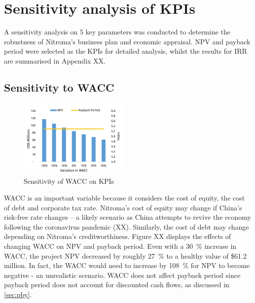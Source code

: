 \section{Sensitivity analysis of KPIs}
\label{sec:sensitivities-kpis}
A sensitivity analysis on 5 key parameters was conducted to determine the robustness of Nitroma’s business plan and economic appraisal. NPV and payback period were selected as the KPIs for detailed analysis, whilst the results for IRR are summarised in Appendix XX. 

\subsection{Sensitivity to WACC}
\begin{figure}
    \vspace{-1.1cm}
    \caption{Sensitivity of WACC on KPIs}
    \label{Sensitivity_WACC}
    \includegraphics[width=0.47\textwidth]{chapters/6-economics/figures/Sensitivity_WACC.jpg}
\end{figure}
WACC is an important variable because it considers the cost of equity, the cost of debt and corporate tax rate. Nitroma’s cost of equity may change if China’s risk-free rate changes – a likely scenario as China attempts to revive the economy following the coronavirus pandemic (XX). Similarly, the cost of debt may change depending on Nitroma’s creditworthiness.  Figure XX displays the effects of changing WACC on NPV and payback period. Even with a \SI{30}{\percent} increase in WACC, the project NPV decreased by roughly \SI{27}{\percent} to a healthy value of \$61.2 million. In fact, the WACC would need to increase by \SI{108}{\percent} for NPV to become negative - an unrealistic scenario. WACC does not affect payback period since payback period does not account for discounted cash flows, as discussed in \cref{sec:pby}. 

